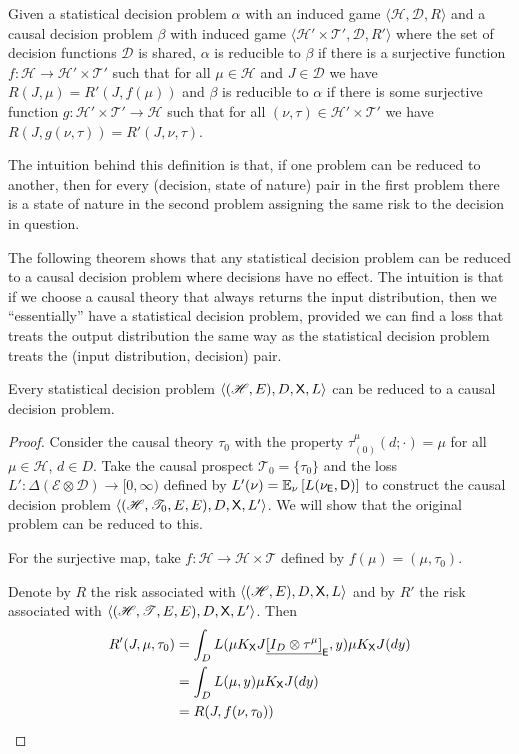 \begin{definition}
Given a statistical decision problem $\alpha$ with an induced game $\langle \mathscr{H}, \mathscr{D}, R\rangle$ and a causal decision problem $\beta$ with induced game $\langle \mathscr{H}'\times \mathscr{T}', \mathscr{D}, R'\rangle$ where the set of decision functions $\mathscr{D}$ is shared, $\alpha$ is reducible to $\beta$ if there is a surjective function $f:\mathscr{H}\to \mathscr{H}'\times\mathscr{T}'$ such that for all $\mu\in \mathscr{H}$ and $J\in \mathscr{D}$ we have $R(J,\mu)=R'(J,f(\mu))$ and $\beta$ is reducible to $\alpha$ if there is some surjective function $g:\mathscr{H}'\times\mathscr{T}'\to \mathscr{H}$ such that for all $(\nu,\tau)\in \mathscr{H}'\times \mathscr{T}'$ we have $R(J,g(\nu,\tau))=R'(J,\nu,\tau)$.
\end{definition}

The intuition behind this definition is that, if one problem can be reduced to another, then for every (decision, state of nature) pair in the first problem there is a state of nature in the second problem assigning the same risk to the decision in question.

The following theorem shows that any statistical decision problem can be reduced to a causal decision problem where decisions have no effect. The intuition is that if we choose a causal theory that always returns the input distribution, then we ``essentially'' have a statistical decision problem, provided we can find a loss that treats the output distribution the same way as the statistical decision problem treats the (input distribution, decision) pair.

\begin{theorem}
Every statistical decision problem $\langle (\mathscr{H},E),D,\mathsf{X},L\rangle$ can be reduced to a causal decision problem.
\end{theorem}
\begin{proof}
Consider the causal theory $\tau_0$ with the property $\tau_(0)^\mu(d;\cdot)=\mu$ for all $\mu\in\mathscr{H}$, $d\in D$. Take the causal prospect $\mathscr{T}_0=\{\tau_0\}$ and the loss $L':\Delta(\mathcal{E}\otimes\mathcal{D})\to[0,\infty)$ defined by $L'(\nu) = \mathbb{E}_\nu \left[L(\nu_{\mathsf{E}},\mathsf{D})\right]$ to construct the causal decision problem $\langle (\mathscr{H},\mathscr{T}_0,E,E),D,\mathsf{X},L'\rangle$. We will show that the original problem can be reduced to this.

For the surjective map, take $f:\mathscr{H}\to \mathscr{H}\times\mathscr{T}$ defined by $f(\mu)=(\mu,\tau_0)$.

Denote by $R$ the risk associated with $\langle (\mathscr{H},E),D,\mathsf{X},L\rangle$ and by $R'$ the risk associated with $\langle (\mathscr{H},\mathscr{T},E,E),D,\mathsf{X},L'\rangle$. Then
\begin{align}
    R'(J,\mu,\tau_0) &= \int_D L(\mu K_{\mathsf{X}} J\underline{[I_D\otimes \tau^\mu]}_{\mathsf{E}}, y) \mu K_{\mathsf{X}} J(dy)\\
                   &= \int_D L(\mu,y) \mu K_{\mathsf{X}} J(dy)\\
                   &=R(J,f(\nu,\tau_0))
\end{align}
\end{proof}


